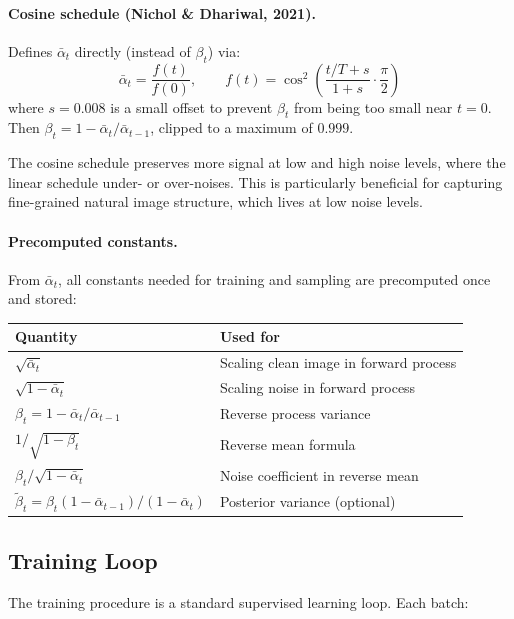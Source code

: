\documentclass[11pt]{article}
\newcommand{\alphabar}{\bar{\alpha}}
\begin{document}
\paragraph{Cosine schedule (Nichol \& Dhariwal, 2021).}
Defines $\alphabar_t$ directly (instead of $\beta_t$) via:
\begin{equation}
    \alphabar_t = \frac{f(t)}{f(0)}, \qquad
    f(t) = \cos^2\!\left(\frac{t/T + s}{1 + s} \cdot \frac{\pi}{2}\right)
    \label{eq:cosine_schedule}
\end{equation}
where $s = 0.008$ is a small offset to prevent $\beta_t$ from being too small
near $t = 0$. Then $\beta_t = 1 - \alphabar_t / \alphabar_{t-1}$, clipped to
a maximum of $0.999$.

The cosine schedule preserves more signal at low and high noise levels, where the
linear schedule under- or over-noises. This is particularly beneficial for
capturing fine-grained natural image structure, which lives at low noise levels.

\paragraph{Precomputed constants.}
From $\alphabar_t$, all constants needed for training and sampling are precomputed
once and stored:
\begin{center}
\begin{tabular}{ll}
\toprule
Quantity & Used for \\
\midrule
$\sqrt{\alphabar_t}$ & Scaling clean image in forward process \\
$\sqrt{1 - \alphabar_t}$ & Scaling noise in forward process \\
$\beta_t = 1 - \alphabar_t/\alphabar_{t-1}$ & Reverse process variance \\
$1/\sqrt{1-\beta_t}$ & Reverse mean formula \\
$\beta_t / \sqrt{1-\alphabar_t}$ & Noise coefficient in reverse mean \\
$\tilde{\beta}_t = \beta_t(1-\alphabar_{t-1})/(1-\alphabar_t)$ & Posterior variance (optional) \\
\bottomrule
\end{tabular}
\end{center}

\subsection{Training Loop}

The training procedure is a standard supervised learning loop. Each batch:
\end{document}
